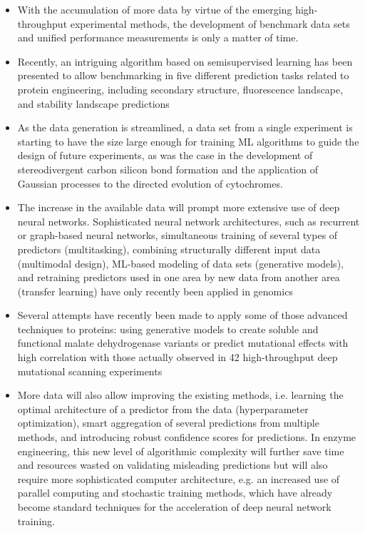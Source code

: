 \documentclass[12pt]{article}
\begin{document}
\begin{itemize}
\item With the accumulation of more data by virtue of the emerging high-throughput experimental methods, the development of benchmark data sets and uniﬁed performance measurements is only a matter of time.

\item Recently, an intriguing algorithm based on semisupervised learning has been presented to allow benchmarking in ﬁve diﬀerent prediction tasks related to protein engineering, including secondary structure, ﬂuorescence landscape, and stability landscape predictions \cite{88}

\item As the data generation is streamlined, a data set from a single experiment is starting to have the size large enough for training ML algorithms to guide the design of future experiments, as was the case in the development of stereodivergent carbon silicon bond formation\cite{71} and the application of Gaussian processes to the directed evolution of cytochromes\cite{89}.

\item The increase in the available data will prompt more
extensive use of deep neural networks. Sophisticated neural network architectures, such as recurrent or graph-based neural networks, simultaneous training of several types of predictors (multitasking), combining structurally diﬀerent input data (multimodal design), ML-based modeling of data sets (generative models), and retraining predictors used in one area by new data from another area (transfer learning) have only recently been applied in genomics\cite{14}

\item Several attempts have recently been made to apply some of those advanced techniques to proteins: using generative models to create soluble and functional malate dehydrogenase variants\cite{90} or predict mutational eﬀects with high correlation with those actually observed in 42 high-throughput deep mutational scanning experiments\cite{91}


\item More data will also allow improving the existing methods, i.e. learning the optimal architecture of a predictor from the data (hyperparameter optimization)\cite{92}, smart aggregation of several predictions from multiple methods\cite{93}, and introducing robust conﬁdence scores for predictions\cite{94}. In enzyme engineering, this new level of algorithmic complexity will further save time and resources wasted on validating misleading predictions but will also require more sophisticated computer architecture, e.g. an increased use of parallel computing and stochastic training methods, which have already become standard techniques for the acceleration of deep neural network training.




\end{itemize}
\end{document}

